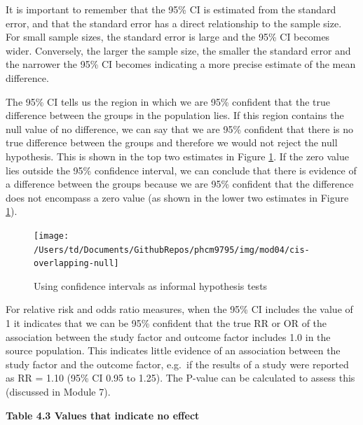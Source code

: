\documentclass[
]{memoir}
\begin{document}
It is important to remember that the 95\% CI is estimated from the standard error, and that the standard error has a direct relationship to the sample size. For small sample sizes, the standard error is large and the 95\% CI becomes wider. Conversely, the larger the sample size, the smaller the standard error and the narrower the 95\% CI becomes indicating a more precise estimate of the mean difference.

The 95\% CI tells us the region in which we are 95\% confident that the true difference between the groups in the population lies. If this region contains the null value of no difference, we can say that we are 95\% confident that there is no true difference between the groups and therefore we would not reject the null hypothesis. This is shown in the top two estimates in Figure \ref{fig:cis-overlapping-null}. If the zero value lies outside the 95\% confidence interval, we can conclude that there is evidence of a difference between the groups because we are 95\% confident that the difference does not encompass a zero value (as shown in the lower two estimates in Figure \ref{fig:cis-overlapping-null}).

\begin{figure}
\texttt{[image: /Users/td/Documents/GithubRepos/phcm9795/img/mod04/cis-overlapping-null]} \caption{Using confidence intervals as informal hypothesis tests}\label{fig:cis-overlapping-null}
\end{figure}

For relative risk and odds ratio measures, when the 95\% CI includes the value of 1 it indicates that we can be 95\% confident that the true RR or OR of the association between the study factor and outcome factor includes 1.0 in the source population. This indicates little evidence of an association between the study factor and the outcome factor, e.g.~if the results of a study were reported as RR = 1.10 (95\% CI 0.95 to 1.25). The P-value can be calculated to assess this (discussed in Module 7).

\textbf{Table 4.3 Values that indicate no effect}

 
  \providecommand{\huxb}[2]{\arrayrulecolor[RGB]{#1}\global\arrayrulewidth=#2pt}
  \providecommand{\huxvb}[2]{\color[RGB]{#1}\vrule width #2pt}
  \providecommand{\huxtpad}[1]{\rule{0pt}{#1}}
  \providecommand{\huxbpad}[1]{\rule[-#1]{0pt}{#1}}
\end{document}
